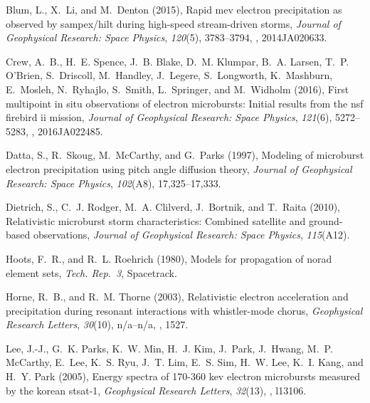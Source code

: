 \documentclass[draft,linenumbers]{agujournal}
\begin{document}
\begin{thebibliography}{35}
Blum, L., X.~Li, and M.~Denton (2015), Rapid mev electron precipitation as
  observed by sampex/hilt during high-speed stream-driven storms,
  \textit{Journal of Geophysical Research: Space Physics}, \textit{120}(5),
  3783--3794, , 2014JA020633.

Crew, A.~B., H.~E. Spence, J.~B. Blake, D.~M. Klumpar, B.~A. Larsen, T.~P.
  O'Brien, S.~Driscoll, M.~Handley, J.~Legere, S.~Longworth, K.~Mashburn,
  E.~Mosleh, N.~Ryhajlo, S.~Smith, L.~Springer, and M.~Widholm (2016), First
  multipoint in situ observations of electron microbursts: Initial results from
  the nsf firebird ii mission, \textit{Journal of Geophysical Research: Space
  Physics}, \textit{121}(6), 5272--5283, ,
  2016JA022485.

Datta, S., R.~Skoug, M.~McCarthy, and G.~Parks (1997), Modeling of microburst
  electron precipitation using pitch angle diffusion theory, \textit{Journal of
  Geophysical Research: Space Physics}, \textit{102}(A8), 17,325--17,333.

Dietrich, S., C.~J. Rodger, M.~A. Clilverd, J.~Bortnik, and T.~Raita (2010),
  Relativistic microburst storm characteristics: Combined satellite and
  ground-based observations, \textit{Journal of Geophysical Research: Space
  Physics}, \textit{115}(A12).

Hoots, F.~R., and R.~L. Roehrich (1980), Models for propagation of norad
  element sets, \textit{Tech. Rep.~3}, Spacetrack.

Horne, R.~B., and R.~M. Thorne (2003), Relativistic electron acceleration and
  precipitation during resonant interactions with whistler-mode chorus,
  \textit{Geophysical Research Letters}, \textit{30}(10), n/a--n/a,
  , 1527.

Lee, J.-J., G.~K. Parks, K.~W. Min, H.~J. Kim, J.~Park, J.~Hwang, M.~P.
  McCarthy, E.~Lee, K.~S. Ryu, J.~T. Lim, E.~S. Sim, H.~W. Lee, K.~I. Kang, and
  H.~Y. Park (2005), Energy spectra of 170-360 kev electron microbursts
  measured by the korean stsat-1, \textit{Geophysical Research Letters},
  \textit{32}(13), , l13106.


\end{thebibliography}
\end{document}
